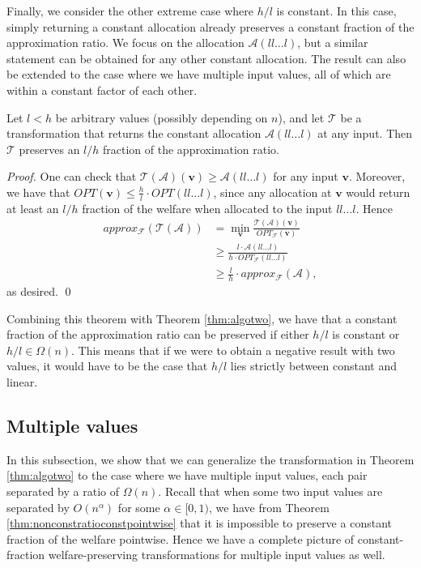 \documentclass[runningheads,a4paper]{llncs}
\begin{document}
Finally, we consider the other extreme case where $h/l$ is constant. In this case, simply returning a constant allocation already preserves a constant fraction of the approximation ratio. We focus on the allocation $\mathcal{A}(ll\dots l)$, but a similar statement can be obtained for any other constant allocation. The result can also be extended to the case where we have multiple input values, all of which are within a constant factor of each other.

\begin{theorem}
\label{thm:constalloc}
Let $l<h$ be arbitrary values (possibly depending on $n$), and let $\mathcal{T}$ be a transformation that returns the constant allocation $\mathcal{A}(ll\dots l)$ at any input. Then $\mathcal{T}$ preserves an $l/h$ fraction of the approximation ratio.
\end{theorem}

\begin{proof}
One can check that $\mathcal{T}(\mathcal{A})(\textbf{v})\geq \mathcal{A}(ll\dots l)$ for any input $\textbf{v}$. Moreover, we have that $OPT(\textbf{v})\leq \frac{h}{l}\cdot OPT(ll\dots l)$, since any allocation at $\textbf{v}$ would return at least an $l/h$ fraction of the welfare when allocated to the input $ll\dots l$. Hence \begin{align*}
approx_\mathcal{F}(\mathcal{T}(\mathcal{A}))&=\min_\textbf{v}\frac{\mathcal{T}(\mathcal{A})(\textbf{v})}{OPT_\mathcal{F}(\textbf{v})}\\
&\geq \frac{l\cdot \mathcal{A}(ll\dots l)}{h\cdot OPT_\mathcal{F}(ll\dots l)}\\
&\geq \frac{l}{h}\cdot approx_\mathcal{F}(\mathcal{A}),
\end{align*}
 as desired. \qed
\end{proof}

Combining this theorem with Theorem \ref{thm:algotwo}, we have that a constant fraction of the approximation ratio can be preserved if either $h/l$ is constant or $h/l\in\Omega(n)$. This means that if we were to obtain a negative result with two values, it would have to be the case that $h/l$ lies strictly between constant and linear.

\subsection{Multiple values}

In this subsection, we show that we can generalize the transformation in Theorem \ref{thm:algotwo} to the case where we have multiple input values, each pair separated by a ratio of $\Omega(n)$. Recall that when some two input values are separated by $O(n^\alpha)$ for some $\alpha\in [0,1)$, we have from Theorem \ref{thm:nonconstratioconstpointwise} that it is impossible to preserve a constant fraction of the welfare pointwise. Hence we have a complete picture of constant-fraction welfare-preserving transformations for multiple input values as well.
\end{document}
